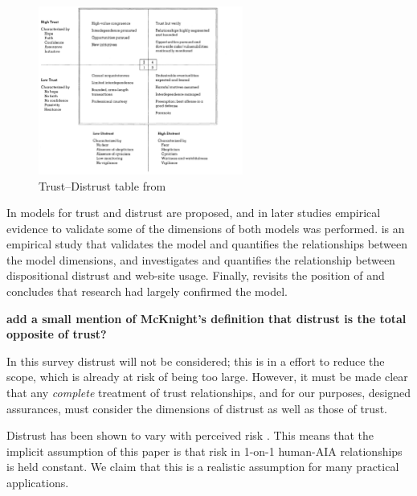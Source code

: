         \begin{figure}[!htbp]
            \centering
            \includegraphics[width=0.6\textwidth]{Figures/distrust_table}
            \caption{Trust--Distrust table from \cite{Lewicki1998-ox}}
            \label{fig:distrust_table}
        \end{figure}

        In \citet{McKnight2001-gz} models for trust and distrust are proposed, and in later studies empirical evidence to validate some of the dimensions of both models was performed. \citet{McKnight2002-qx} is an empirical study that validates the model and quantifies the relationships between the model dimensions, and \citet{Harrison_McKnight2004-vv} investigates and quantifies the relationship between dispositional distrust and web-site usage. Finally, \citet{McKnight2006-ce} revisits the position of \citet{McKnight1998-ty} and concludes that research had largely confirmed the model.

        \textbf{add a small mention of McKnight's definition that distrust is the total opposite of trust?}

        In this survey distrust will not be considered; this is in a effort to reduce the scope, which is already at risk of being too large. However, it must be made clear that any \emph{complete} treatment of trust relationships, and for our purposes, designed assurances, must consider the dimensions of distrust as well as those of trust. 
        
        Distrust has been shown to vary with perceived risk \cite{McKnight2004-vv}. This means that the implicit assumption of this paper is that risk in 1-on-1 human-AIA relationships is held constant. We claim that this is a realistic assumption for many practical applications.
